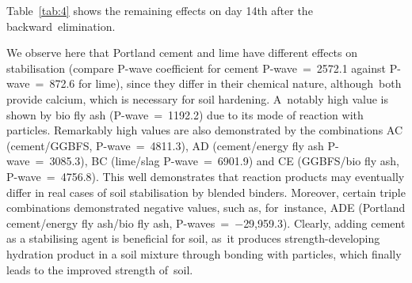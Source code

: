 \documentclass[materials,article,accept,pdftex,moreauthors]{Definitions/mdpi}
\begin{document}
     
Table~\ref{tab:4} shows the remaining effects on day {14}th after the backward~elimination. 


We observe here that Portland cement and lime have different effects on stabilisation (compare P-wave coefficient for cement P-wave~=~2572.1 against P-wave~=~872.6 for lime), since they differ in their chemical nature, although~both provide calcium, which is necessary for soil hardening. A~notably high value is shown by bio fly ash (P-wave~=~1192.2) due to its mode of reaction with particles. Remarkably high values are also demonstrated by the combinations AC (cement/GGBFS, P-wave~=~4811.3), AD (cement/energy fly ash P-wave~=~3085.3), BC (lime/slag P-wave~=~6901.9) and CE (GGBFS/bio fly ash, P-wave~=~4756.8). This well demonstrates that reaction products may eventually differ in real cases of soil stabilisation by blended binders. Moreover, certain triple combinations demonstrated negative values, such as, for~instance, ADE (Portland cement/energy fly ash/bio fly ash, P-waves~=~$-$29,959.3). Clearly, adding cement as a stabilising agent is beneficial for soil, as~it produces strength-developing hydration product in a soil mixture through bonding with particles, which finally leads to the improved strength of~soil. 
\end{document}
